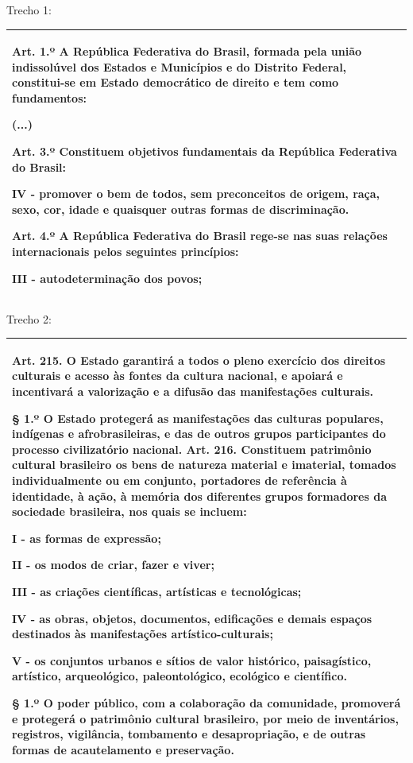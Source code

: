 Trecho 1:

\begin{longtable}[]{@{}
  >{\raggedright\arraybackslash}p{}@{}}
\toprule
\endhead
Art. 1.º A República Federativa do Brasil, formada pela união
indissolúvel dos Estados e Municípios e do Distrito Federal,
constitui-se em Estado democrático de direito e tem como fundamentos:

(...)

Art. 3.º Constituem objetivos fundamentais da República Federativa do
Brasil:

IV - promover o bem de todos, sem preconceitos de origem, raça, sexo,
cor, idade e quaisquer outras formas de discriminação.

Art. 4.º A República Federativa do Brasil rege-se nas suas relações
internacionais pelos seguintes princípios:

III - autodeterminação dos povos; \\
\bottomrule
\end{longtable}

Trecho 2:

\begin{longtable}[]{@{}
  >{\raggedright\arraybackslash}p{}@{}}
\toprule
\endhead
Art. 215. O Estado garantirá a todos o pleno exercício dos direitos
culturais e acesso às fontes da cultura nacional, e apoiará e
incentivará a valorização e a difusão das manifestações culturais.

§ 1.º O Estado protegerá as manifestações das culturas populares,
indígenas e afrobrasileiras, e das de outros grupos participantes do
processo civilizatório nacional. Art. 216. Constituem patrimônio
cultural brasileiro os bens de natureza material e imaterial, tomados
individualmente ou em conjunto, portadores de referência à identidade, à
ação, à memória dos diferentes grupos formadores da sociedade
brasileira, nos quais se incluem:

I - as formas de expressão;

II - os modos de criar, fazer e viver;

III - as criações científicas, artísticas e tecnológicas;

IV - as obras, objetos, documentos, edificações e demais espaços
destinados às manifestações artístico-culturais;

V - os conjuntos urbanos e sítios de valor histórico, paisagístico,
artístico, arqueológico, paleontológico, ecológico e científico.

§ 1.º O poder público, com a colaboração da comunidade, promoverá e
protegerá o patrimônio cultural brasileiro, por meio de inventários,
registros, vigilância, tombamento e desapropriação, e de outras formas
de acautelamento e preservação. \\
\bottomrule
\end{longtable}

